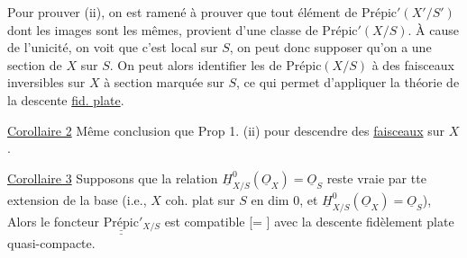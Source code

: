 Pour prouver (ii), on est ramené à prouver que tout élément de $\mathrm{Prépic}'(X'/S')$ dont les images sont les mêmes, provient d'une classe de $\mathrm{Prépic}'(X/S)$. À cause de l'unicité, on voit que c'est local sur $S$, on peut donc supposer qu'on a une section de $X$ sur $S$. On peut alors identifier les  de $\mathrm{Prépic}(X/S)$ à des faisceaux inversibles  sur $X$ à section marquée sur $S$, ce qui permet d'appliquer la théorie de la descente \uline{fid. plate}.

\uline{Corollaire 2} Même conclusion que Prop 1. (ii) pour descendre des \uline{faisceaux} sur $X$.

\uline{Corollaire 3} Supposons que la relation $\underline H^0_{X/S}(\underline O_X)=\underline O_S$ reste vraie par tte extension de la base (i.e., $X$ coh. plat sur $S$ en dim 0, et $\underline H^0_{X/S}(\underline O_X)=\underline O_S$),  Alors le foncteur $\underline{\underline{\mathrm{Prépic}}}'_{X/S}$ est compatible [= ] avec la descente fidèlement plate quasi-compacte.


